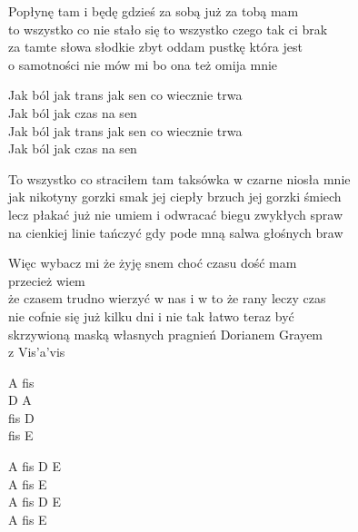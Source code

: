 \begin{text}
    \footnotesize{
    Popłynę tam i będę gdzieś za sobą już za tobą mam\\
    to wszystko co nie stało się to wszystko czego tak ci brak\\
    za tamte słowa słodkie zbyt oddam pustkę która jest\\
    o samotności nie mów mi bo ona też omija mnie

    Jak ból jak trans jak sen co wiecznie trwa\\
    Jak ból jak czas na sen\\
    Jak ból jak trans jak sen co wiecznie trwa\\
    Jak ból jak czas na sen

    To wszystko co straciłem tam taksówka w czarne niosła mnie\\
    jak nikotyny gorzki smak jej ciepły brzuch jej gorzki śmiech\\
    lecz płakać już nie umiem i odwracać biegu zwykłych spraw\\
    na cienkiej linie tańczyć gdy pode mną salwa głośnych braw

    Więc wybacz mi że żyję snem choć czasu dość mam\\
    przecież wiem\\
    że czasem trudno wierzyć w nas i w to że rany leczy czas\\
    nie cofnie się już kilku dni i nie tak łatwo teraz być\\
    skrzywioną maską własnych pragnień Dorianem Grayem\\
    z Vis'a'vis
    }
\end{text}
\begin{chord}
    \footnotesize{
    A fis\\
    D A\\
    fis D\\
    fis E

    A fis D E\\
    A fis E\\
    A fis D E\\
    A fis E
    }
\end{chord}